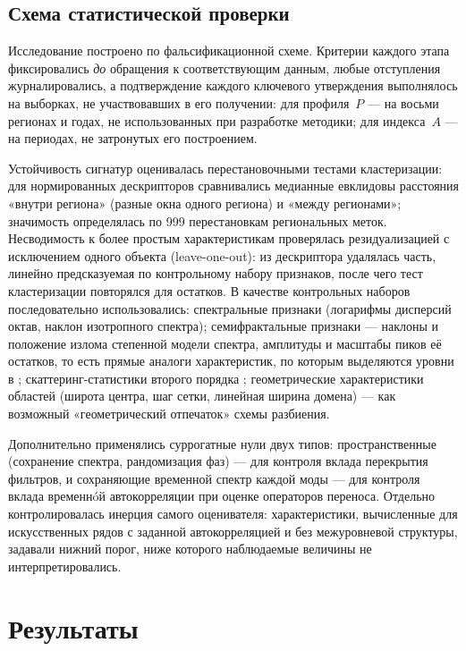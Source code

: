 \documentclass[11pt,a4paper]{article}
\begin{document}
\subsection{Схема статистической проверки}

Исследование построено по фальсификационной схеме. Критерии каждого этапа фиксировались \emph{до} обращения к соответствующим данным, любые отступления журналировались, а подтверждение каждого ключевого утверждения выполнялось на выборках, не участвовавших в его получении: для профиля~$P$ --- на восьми регионах и годах, не использованных при разработке методики; для индекса~$A$ --- на периодах, не затронутых его построением.

Устойчивость сигнатур оценивалась перестановочными тестами кластеризации: для нормированных дескрипторов сравнивались медианные евклидовы расстояния «внутри региона» (разные окна одного региона) и «между регионами»; значимость определялась по 999 перестановкам региональных меток. Несводимость к более простым характеристикам проверялась резидуализацией с исключением одного объекта (leave-one-out): из дескриптора удалялась часть, линейно предсказуемая по контрольному набору признаков, после чего тест кластеризации повторялся для остатков. В качестве контрольных наборов последовательно использовались: спектральные признаки (логарифмы дисперсий октав, наклон изотропного спектра); семифрактальные признаки --- наклоны и положение излома степенной модели спектра, амплитуды и масштабы пиков её остатков, то есть прямые аналоги характеристик, по которым выделяются уровни в \cite{Krenke2019}; скаттеринг-статистики второго порядка \cite{Cheng2024}; геометрические характеристики областей (широта центра, шаг сетки, линейная ширина домена) --- как возможный «геометрический отпечаток» схемы разбиения.

Дополнительно применялись суррогатные нули двух типов: пространственные (сохранение спектра, рандомизация фаз) --- для контроля вклада перекрытия фильтров, и сохраняющие временной спектр каждой моды --- для контроля вклада временнóй автокорреляции при оценке операторов переноса. Отдельно контролировалась инерция самого оценивателя: характеристики, вычисленные для искусственных рядов с заданной автокорреляцией и без межуровневой структуры, задавали нижний порог, ниже которого наблюдаемые величины не интерпретировались.

\section{Результаты}
\label{sec:results}
\end{document}
